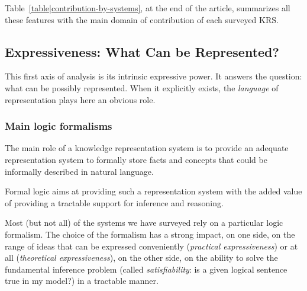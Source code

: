 \documentclass[a4paper, twocolumn]{article}
\begin{document}
Table~\ref{table|contribution-by-systems}, at the end of the article,
summarizes all these features with the main domain of contribution of each
surveyed KRS.



\subsection{Expressiveness: What Can be Represented?}
\label{sect|expressiveness}

\begin{scriptsize}
\begin{center}
\end{center}
\end{scriptsize}

This first axis of analysis is its intrinsic expressive power. It answers the
question: what can be possibly represented. When it explicitly exists, the
\emph{language} of representation plays here an obvious role.

\subsubsection{Main logic formalisms}

The main role of a knowledge representation system is to provide an adequate
representation system to formally store facts and concepts that could be informally
described in natural language.

Formal logic aims at providing such a representation system with the added
value of providing a tractable support for inference and reasoning.

Most (but not all) of the systems we have surveyed rely on a particular logic
formalism. The choice of the formalism has a strong impact, on one side, on the
range of ideas that can be expressed conveniently (\emph{practical
expressiveness}) or at all (\emph{theoretical expressiveness}), on the other
side, on the ability to solve the fundamental inference problem (called
\emph{satisfiability}: is a given logical sentence true in my model?) in a
tractable manner.
\end{document}
